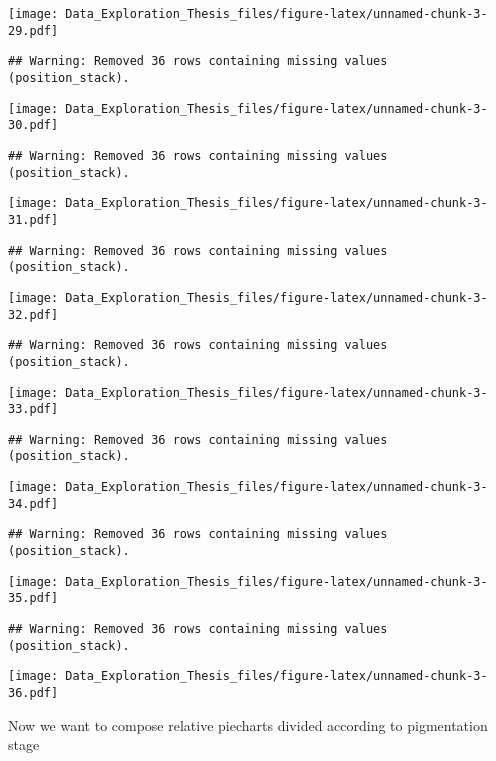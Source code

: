 \documentclass[]{article}
\begin{document}
\texttt{[image: Data\_Exploration\_Thesis\_files/figure-latex/unnamed-chunk-3-29.pdf]}

\begin{verbatim}
## Warning: Removed 36 rows containing missing values (position_stack).
\end{verbatim}

\texttt{[image: Data\_Exploration\_Thesis\_files/figure-latex/unnamed-chunk-3-30.pdf]}

\begin{verbatim}
## Warning: Removed 36 rows containing missing values (position_stack).
\end{verbatim}

\texttt{[image: Data\_Exploration\_Thesis\_files/figure-latex/unnamed-chunk-3-31.pdf]}

\begin{verbatim}
## Warning: Removed 36 rows containing missing values (position_stack).
\end{verbatim}

\texttt{[image: Data\_Exploration\_Thesis\_files/figure-latex/unnamed-chunk-3-32.pdf]}

\begin{verbatim}
## Warning: Removed 36 rows containing missing values (position_stack).
\end{verbatim}

\texttt{[image: Data\_Exploration\_Thesis\_files/figure-latex/unnamed-chunk-3-33.pdf]}

\begin{verbatim}
## Warning: Removed 36 rows containing missing values (position_stack).
\end{verbatim}

\texttt{[image: Data\_Exploration\_Thesis\_files/figure-latex/unnamed-chunk-3-34.pdf]}

\begin{verbatim}
## Warning: Removed 36 rows containing missing values (position_stack).
\end{verbatim}

\texttt{[image: Data\_Exploration\_Thesis\_files/figure-latex/unnamed-chunk-3-35.pdf]}

\begin{verbatim}
## Warning: Removed 36 rows containing missing values (position_stack).
\end{verbatim}

\texttt{[image: Data\_Exploration\_Thesis\_files/figure-latex/unnamed-chunk-3-36.pdf]}

Now we want to compose relative piecharts divided according to
pigmentation stage
\end{document}
